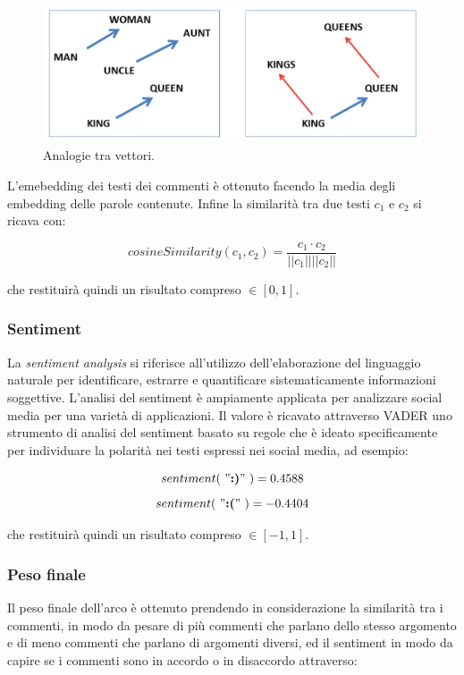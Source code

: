 \begin{figure}
    \includegraphics[width=\linewidth]{Immagini/king-queen.png}
    \caption{Analogie tra vettori.}
    \label{fig:analogy}
\end{figure}

L'emebedding dei testi dei commenti è ottenuto facendo la media degli embedding delle parole contenute. Infine la similarità tra due testi $c_1$ e $c_2$ si ricava con:

$$cosineSimilarity(c_1, c_2) = \frac{c_1 \cdot c_2}{||c_1|| ||c_2||}$$

che restituirà quindi un risultato compreso $\in [0, 1]$.

\subsubsection{Sentiment}
La \textit{sentiment analysis} si riferisce all'utilizzo dell'elaborazione del linguaggio naturale per identificare, estrarre e quantificare sistematicamente informazioni soggettive. L'analisi del sentiment è ampiamente applicata per analizzare social media per una varietà di applicazioni. Il valore è ricavato attraverso VADER \cite{hutto2014vader} uno strumento di analisi del sentiment basato su regole che è ideato specificamente per individuare la polarità nei testi espressi nei social media, ad esempio:

    $$sentiment(\ "\textbf{:)}" \ ) = 0.4588$$
    $$sentiment(\ "\textbf{:(}" \ ) = -0.4404$$

che restituirà quindi un risultato compreso $\in [-1, 1]$.

\subsubsection{Peso finale}
Il peso finale dell'arco è ottenuto prendendo in considerazione la similarità tra i commenti, in modo da pesare di più commenti che parlano dello stesso argomento e di meno commenti che parlano di argomenti diversi, ed il sentiment in modo da capire se i commenti sono in accordo o in disaccordo attraverso:

